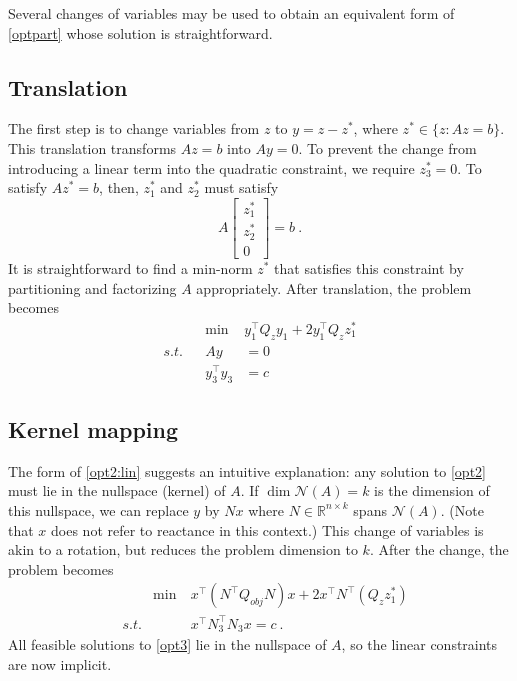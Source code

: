 \documentclass[conference]{IEEEtran}
\begin{document}
Several changes of variables may be used to obtain an equivalent form of \eqref{optpart} whose solution is straightforward.

\subsection{Translation}

The first step is to change variables from $z$ to $y=z-z^*$, where $z^*\in\{z:Az=b\}$. This translation transforms $Az=b$ into $Ay=0$. To prevent the change from introducing a linear term into the quadratic constraint, we require $z_3^*=0$. To satisfy $Az^*=b$, then, $z_1^*$ and $z_2^*$ must satisfy $$ A\begin{bmatrix} z_1^* \\ z_2^* \\ 0 \end{bmatrix} = b ~.$$ It is straightforward to find a min-norm $z^*$ that satisfies this constraint by partitioning and factorizing $A$ appropriately. After translation, the problem becomes
\begin{subequations}\label{opt2}
\begin{align}
\label{opt2:obj} && \min~ & y_1^\top Q_z y_1 + 2 y_1^\top Q_z z_1^* \\
\label{opt2:lin} s.t. && Ay &= 0 \\
\label{opt2:quad} && y_3^\top y_3 &= c
\end{align}
\end{subequations}

\subsection{Kernel mapping}

The form of \eqref{opt2:lin} suggests an intuitive explanation: any solution to \eqref{opt2} must lie in the nullspace (kernel) of $A$. If $\dim \mathcal{N}(A) =k$ is the dimension of this nullspace, we can replace $y$ by $Nx$ where $N\in\mathbb{R}^{n\times k}$ spans $\mathcal{N}(A)$. (Note that $x$ does not refer to reactance in this context.) This change of variables is akin to a rotation, but reduces the problem dimension to $k$. After the change, the problem becomes
\begin{subequations}\label{opt3}
\begin{align}
\label{opt3:obj} && \min~ & x^\top (N^\top Q_{obj}N) x + 2x^\top N^\top(Q_zz_1^*) \\
\label{opt3:quad} & s.t. && x^\top N_3^\top N_3 x = c~.
\end{align}
\end{subequations}
All feasible solutions to \eqref{opt3} lie in the nullspace of $A$, so the linear constraints are now implicit.
\end{document}
